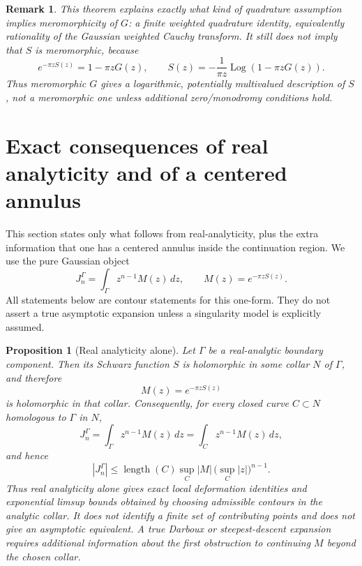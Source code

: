 \documentclass[11pt]{article}
\newtheorem{proposition}[theorem]{Proposition}
\newtheorem{remark}[theorem]{Remark}
\newcommand{\dd}{\,d}
\newcommand{\1}{\mathbf 1}
\newcommand{\Log}{\operatorname{Log}}
\begin{document}
\begin{remark}
This theorem explains exactly what kind of quadrature assumption implies meromorphicity of
\(G\): a finite weighted quadrature identity, equivalently rationality of the Gaussian
weighted Cauchy transform. It still does not imply that \(S\) is meromorphic, because
\[
  e^{-\pi zS(z)}=1-\pi zG(z),
  \qquad
  S(z)=-\frac{1}{\pi z}\Log(1-\pi zG(z)).
\]
Thus meromorphic \(G\) gives a logarithmic, potentially multivalued description of \(S\),
not a meromorphic one unless additional zero/monodromy conditions hold.
\end{remark}

\section{Exact consequences of real analyticity and of a centered annulus}

This section states only what follows from real-analyticity, plus the extra information that
one has a centered annulus inside the continuation region. We use the pure Gaussian object
\[
  J_n^\Gamma=\int_\Gamma z^{n-1}M(z)\dd z,
  \qquad M(z)=e^{-\pi zS(z)}.
\]
All statements below are contour statements for this one-form. They do not assert a true
asymptotic expansion unless a singularity model is explicitly assumed.

\begin{proposition}[Real analyticity alone]\label{prop:real-analytic-alone}
Let \(\Gamma\) be a real-analytic boundary component. Then its Schwarz function \(S\) is
holomorphic in some collar \(N\) of \(\Gamma\), and therefore
\[
  M(z)=e^{-\pi zS(z)}
\]
is holomorphic in that collar. Consequently, for every closed curve \(C\subset N\)
homologous to \(\Gamma\) in \(N\),
\[
  J_n^\Gamma=\int_\Gamma z^{n-1}M(z)\dd z
  =\int_C z^{n-1}M(z)\dd z,
\]
and hence
\[
  |J_n^\Gamma|\le \operatorname{length}(C)\sup_C|M|\,\bigl(\sup_C|z|\bigr)^{n-1}.
\]
Thus real analyticity alone gives exact local deformation identities and exponential
limsup bounds obtained by choosing admissible contours in the analytic collar. It does not
identify a finite set of contributing points and does not give an asymptotic equivalent.
A true Darboux or steepest-descent expansion requires additional information about the
first obstruction to continuing \(M\) beyond the chosen collar.
\end{proposition}
\end{document}
